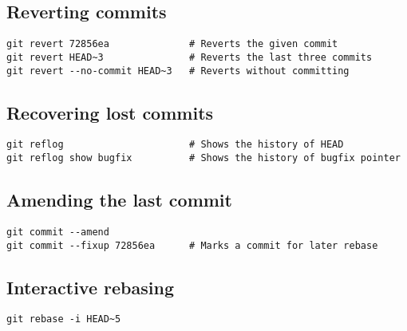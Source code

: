 \documentclass[a4paper,10pt]{article}
\newcommand{\subsectiontitle}[1]{\subsection*{#1}\vspace{-0.3em}}
\begin{document}
\subsectiontitle{Reverting commits}
\begin{verbatim}
git revert 72856ea              # Reverts the given commit
git revert HEAD~3               # Reverts the last three commits
git revert --no-commit HEAD~3   # Reverts without committing
\end{verbatim}

\subsectiontitle{Recovering lost commits}
\begin{verbatim}
git reflog                      # Shows the history of HEAD
git reflog show bugfix          # Shows the history of bugfix pointer
\end{verbatim}

\subsectiontitle{Amending the last commit}
\begin{verbatim}
git commit --amend
git commit --fixup 72856ea      # Marks a commit for later rebase
\end{verbatim}

\subsectiontitle{Interactive rebasing}
\begin{verbatim}
git rebase -i HEAD~5
\end{verbatim}
\end{document}

